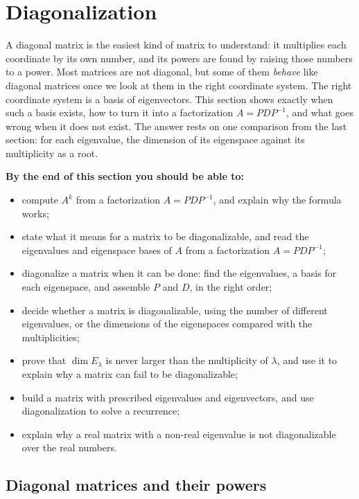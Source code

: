 \documentclass[11pt]{article}
\begin{document}
\section{Diagonalization}

\begin{guide}
A diagonal matrix is the easiest kind of matrix to understand: it multiplies each coordinate by its own number, and its powers are found by raising those numbers to a power. Most matrices are not diagonal, but some of them \emph{behave} like diagonal matrices once we look at them in the right coordinate system. The right coordinate system is a basis of eigenvectors. This section shows exactly when such a basis exists, how to turn it into a factorization $A=PDP^{-1}$, and what goes wrong when it does not exist. The answer rests on one comparison from the last section: for each eigenvalue, the dimension of its eigenspace against its multiplicity as a root.
\end{guide}

\textbf{By the end of this section you should be able to:}
\begin{itemize}
  \item compute $A^k$ from a factorization $A=PDP^{-1}$, and explain why the formula works;
  \item state what it means for a matrix to be diagonalizable, and read the eigenvalues and eigenspace bases of $A$ from a factorization $A=PDP^{-1}$;
  \item diagonalize a matrix when it can be done: find the eigenvalues, a basis for each eigenspace, and assemble $P$ and $D$, in the right order;
  \item decide whether a matrix is diagonalizable, using the number of different eigenvalues, or the dimensions of the eigenspaces compared with the multiplicities;
  \item prove that $\dim E_\lambda$ is never larger than the multiplicity of $\lambda$, and use it to explain why a matrix can fail to be diagonalizable;
  \item build a matrix with prescribed eigenvalues and eigenvectors, and use diagonalization to solve a recurrence;
  \item explain why a real matrix with a non-real eigenvalue is not diagonalizable over the real numbers.
\end{itemize}

\subsection*{Diagonal matrices and their powers}
\end{document}

